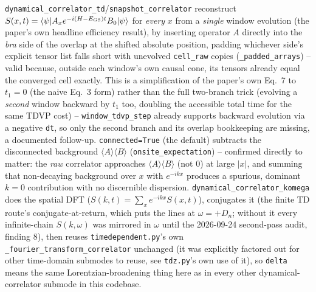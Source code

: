 \documentclass[11pt]{article}
\begin{document}
\texttt{dynamical\_correlator\_td}/\texttt{snapshot\_correlator}
reconstruct $S(x,t)=\langle\psi|A_x e^{-i(H-E_{\rm GS})t}B_0|\psi\rangle$ for
\emph{every} $x$ from a \emph{single} window evolution (the paper's own
headline efficiency result), by inserting operator $A$ directly into
the \emph{bra} side of the overlap at the shifted absolute position,
padding whichever side's explicit tensor list falls short with
unevolved \texttt{cell\_raw} copies (\texttt{\_padded\_arrays}) -- valid
because, outside each window's own causal cone, its tensors already
equal the converged cell exactly. This is a simplification of the paper's
own Eq.~7 to $t_1=0$ (the naive Eq.~3 form) rather than the full
two-branch trick (evolving a \emph{second} window backward by $t_1$
too, doubling the accessible total time for the same TDVP cost) --
\texttt{window\_tdvp\_step} already supports backward evolution via a
negative \texttt{dt}, so only the second branch and its overlap
bookkeeping are missing, a documented follow-up. \texttt{connected=True}
(the default) subtracts the disconnected background $\langle A\rangle
\langle B\rangle$ (\texttt{onsite\_expectation}) -- confirmed directly
to matter: the \emph{raw} correlator approaches $\langle A\rangle
\langle B\rangle$ (not $0$) at large $|x|$, and summing that
non-decaying background over $x$ with $e^{-ikx}$ produces a spurious,
dominant $k=0$ contribution with no discernible dispersion.
\texttt{dynamical\_correlator\_komega} does the spatial DFT
($S(k,t)=\sum_x e^{-ikx}S(x,t)$), conjugates it (the finite TD route's
conjugate-at-return, which puts the lines at $\omega=+D_n$; without it
every infinite-chain $S(k,\omega)$ was mirrored in $\omega$ until the
2026-09-24 second-pass audit, finding 8), then reuses
\texttt{timedependent.py}'s
own \texttt{\_fourier\_transform\_correlator} unchanged (it was
explicitly factored out for other time-domain submodes to reuse, see
\texttt{tdz.py}'s own use of it), so \texttt{delta} means the same
Lorentzian-broadening thing here as in every other dynamical-correlator
submode in this codebase.
\end{document}

